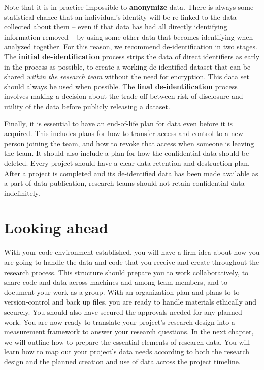 Note that it is in practice impossible
to \textbf{anonymize} data.
There is always some statistical chance that an individual's identity
will be re-linked to the data collected about them
-- even if that data has had all directly identifying information removed --
by using some other data that becomes identifying when analyzed together.
For this reason, we recommend de-identification in two stages.
The \textbf{initial de-identification} process strips the data of direct identifiers
as early in the process as possible,
to create a working de-identified dataset that
can be shared \textit{within the research team} without the need for encryption.
This data set should always be used when possible.
The \textbf{final de-identification} process involves
making a decision about the trade-off between
risk of disclosure and utility of the data
before publicly releasing a dataset.

Finally, it is essential to have an end-of-life plan for data even before it is acquired.
This includes plans for how to transfer access and control to a new person joining the team,
and how to revoke that access when someone is leaving the team.
It should also include a plan for how the confidential data should be deleted.
Every project should have a clear data retention and destruction plan.
After a project is completed and its
de-identified data has been made available as a part of data publication,
research teams should not retain confidential data indefinitely.

\section{Looking ahead}
With your code environment established,
you will have a firm idea about how you are going to
handle the data and code that
you receive and create throughout the research process.
This structure should prepare you to work collaboratively,
to share code and data across machines and among team members,
and to document your work as a group.
With an organization plan
and plans to to version-control and back up files,
you are ready to handle materials ethically and securely.
You should also have secured the approvals needed for any planned work.
You are now ready to translate your project's research design into a measurement framework
to answer your research questions.
In the next chapter,
we will outline how to prepare the essential elements of research data.
You will learn how to map out your project's data needs
according to both the research design
and the planned creation and use of data across the project timeline.
